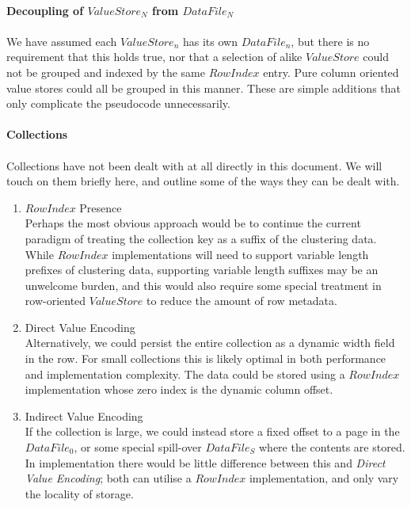 \documentclass[fleqn]{article}
\begin{document}
\paragraph{Decoupling of $ValueStore_N$ from $DataFile_N$}
\paragraph{}
    We have assumed each $ValueStore_n$ has its own $DataFile_n$, but there is no requirement that this holds true,
    nor that a selection of alike $ValueStore$ could not be grouped and indexed by the same $RowIndex$ entry. Pure 
    column oriented value stores could all be grouped in this manner. These are simple additions that only 
    complicate the pseudocode unnecessarily.
\paragraph{Collections}
\paragraph{}
    Collections have not been dealt with at all directly in this document. We will touch on them briefly here,
    and outline some of the ways they can be dealt with.
    \begin{enumerate}
      \item{$RowIndex$ Presence}\\[2pt]
        Perhaps the most obvious approach would be to continue the current paradigm of treating the collection key
        as a suffix of the clustering data. While $RowIndex$ implementations will need to support variable length
        prefixes of clustering data, supporting variable length suffixes may be an unwelcome burden, and this
        would also require some special treatment in row-oriented $ValueStore$ to reduce the amount of row metadata.
      \item{Direct Value Encoding}\\[2pt]
        Alternatively, we could persist the entire collection as a dynamic width field in the row. For small
        collections this is likely optimal in both performance and implementation complexity. The data could
        be stored using a $RowIndex$ implementation whose zero index is the dynamic column offset.
      \item{Indirect Value Encoding}\\[2pt]
        If the collection is large, we could instead store a fixed offset to a page in the $DataFile_0$, or some
        special spill-over $DataFile_S$ where the contents are stored. In implementation there would be little
        difference between this and \textit{Direct Value Encoding}; both can utilise a $RowIndex$ implementation,
        and only vary the locality of storage.
    \end{enumerate}
\end{document}
